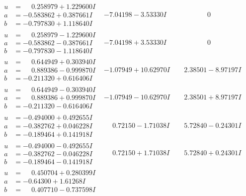 \documentclass[1p]{elsarticle_modified}
\theoremstyle{definition}
\begin{document}
$$\begin{array}{c|c|c}
\begin{aligned}
u &= \phantom{-}0.258979 + 1.229600 I \\
a &= -0.583862 + 0.387661 I \\
b &= -0.797830 + 1.118640 I\end{aligned}
 & -7.04198 - 3.53330 I & \phantom{-0.000000 } 0 \\ \hline\begin{aligned}
u &= \phantom{-}0.258979 - 1.229600 I \\
a &= -0.583862 - 0.387661 I \\
b &= -0.797830 - 1.118640 I\end{aligned}
 & -7.04198 + 3.53330 I & \phantom{-0.000000 } 0 \\ \hline\begin{aligned}
u &= \phantom{-}0.644949 + 0.303940 I \\
a &= \phantom{-}0.889386 - 0.999870 I \\
b &= -0.211320 + 0.616406 I\end{aligned}
 & -1.07949 + 10.62970 I & \phantom{-}2.38501 - 8.97197 I \\ \hline\begin{aligned}
u &= \phantom{-}0.644949 - 0.303940 I \\
a &= \phantom{-}0.889386 + 0.999870 I \\
b &= -0.211320 - 0.616406 I\end{aligned}
 & -1.07949 - 10.62970 I & \phantom{-}2.38501 + 8.97197 I \\ \hline\begin{aligned}
u &= -0.494000 + 0.492655 I \\
a &= -0.382762 + 0.046228 I \\
b &= -0.189464 + 0.141918 I\end{aligned}
 & \phantom{-}0.72150 - 1.71038 I & \phantom{-}5.72840 - 0.24301 I \\ \hline\begin{aligned}
u &= -0.494000 - 0.492655 I \\
a &= -0.382762 - 0.046228 I \\
b &= -0.189464 - 0.141918 I\end{aligned}
 & \phantom{-}0.72150 + 1.71038 I & \phantom{-}5.72840 + 0.24301 I \\ \hline\begin{aligned}
u &= \phantom{-}0.450704 + 0.280399 I \\
a &= -0.64300 + 1.61268 I \\
b &= \phantom{-}0.407710 - 0.737598 I\end{aligned}

\end{array}$$
\end{document}
